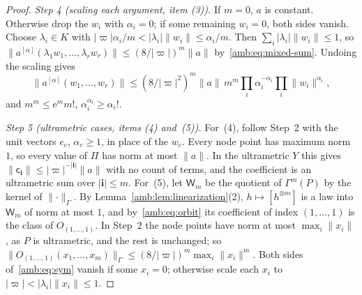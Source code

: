 \documentclass[11pt]{amsart}
\theoremstyle{definition}
\theoremstyle{remark}
\numberwithin{equation}{section}
\newcommand{\abs}[1]{\lvert #1\rvert}
\newcommand{\norm}[1]{\lVert #1\rVert}
\theoremstyle{plain}
\theoremstyle{definition}
\theoremstyle{plain}
\begin{document}
\begin{proof}
\emph{Step 4 (scaling each argument, item (3)).} If $m=0$, $a$ is constant. Otherwise drop the $w_i$ with $\alpha_i=0$; if some remaining $w_i=0$, both sides vanish. Choose $\lambda_i\in K$ with $\abs\varpi\alpha_i/m<\abs{\lambda_i}\norm{w_i}\le\alpha_i/m$. Then $\sum_i\abs{\lambda_i}\norm{w_i}\le1$, so $\norm{a^{[\alpha]}(\lambda_1w_1,\dots,\lambda_rw_r)}\le(8/\abs\varpi)^m\norm a$ by~\eqref{amb:eq:mixed-sum}. Undoing the scaling gives
\[
 \norm{a^{[\alpha]}(w_1,\dots,w_r)}\le(8/\abs\varpi^2)^m\norm a\,m^m\prod_i\alpha_i^{-\alpha_i}\prod_i\norm{w_i}^{\alpha_i},
\]
and $m^m\le\mathrm e^mm!$, $\alpha_i^{\alpha_i}\ge\alpha_i!$.

\emph{Step 5 (ultrametric cases, items (4) and~(5)).} For~(4), follow Step~2 with the unit vectors $e_c$, $\alpha_c\ge1$, in place of the $w_c$. Every node point has maximum norm $1$, so every value of $\Pi$ has norm at most $\norm a$. In the ultrametric $Y$ this gives $\norm{\mathsf c_{\mathbf i}}\le\abs\varpi^{-\abs{\mathbf i}}\norm a$ with no count of terms, and the coefficient is an ultrametric sum over $\abs{\mathbf i}\le m$. For~(5), let $\mathsf W_m$ be the quotient of $\Gamma^m(P)$ by the kernel of $\norm\cdot_\Gamma$. By Lemma~\ref{amb:lem:linearization}(2), $h\mapsto[h^{\otimes m}]$ is a law into $\mathsf W_m$ of norm at most $1$, and by~\eqref{amb:eq:orbit} its coefficient of index $(1,\dots,1)$ is the class of $O_{(1,\dots,1)}$. In Step~2 the node points have norm at most $\max_i\norm{x_i}$, as $P$ is ultrametric, and the rest is unchanged; so $\norm{O_{(1,\dots,1)}(x_1,\dots,x_m)}_\Gamma\le(8/\abs\varpi)^m\max_i\norm{x_i}^m$. Both sides of~\eqref{amb:eq:sym} vanish if some $x_i=0$; otherwise scale each $x_i$ to $\abs\varpi<\abs{\lambda_i}\norm{x_i}\le1$.
\end{proof}
\end{document}
